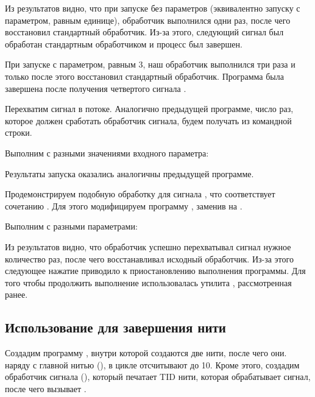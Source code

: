 Из результатов видно, что при запуске без параметров (эквивалентно запуску с параметром, равным единице), обработчик выполнился одни раз, после чего восстановил стандартный обработчик. Из-за этого, следующий сигнал  был обработан стандартным обработчиком и процесс был завершен.

При запуске с параметром, равным 3, наш обработчик выполнился три раза и только после этого восстановил стандартный обработчик. Программа была завершена после получения четвертого сигнала .

Перехватим сигнал  в потоке. Аналогично предыдущей программе, число раз, которое должен сработать обработчик сигнала, будем получать из командной строки.



Выполним  с разными значениями входного параметра:



Результаты запуска оказались аналогичны предыдущей программе.

Продемонстрируем подобную обработку для сигнала , что соответствует сочетанию . Для этого модифицируем программу , заменив  на .



Выполним с разными параметрами:



Из результатов видно, что обработчик успешно перехватывал сигнал  нужное количество раз, после чего восстанавливал исходный обработчик. Из-за этого следующее нажатие  приводило к приостановлению выполнения программы. Для того чтобы продолжить выполнение использовалась утилита , рассмотренная ранее.

\newpage

\subsection{Использование  для завершения нити}

Создадим программу , внутри которой создаются две нити, после чего они. наряду с главной нитью (), в цикле отсчитывают до 10. Кроме этого, создадим обработчик сигнала (), который печатает TID нити, которая обрабатывает сигнал, после чего вызывает .

